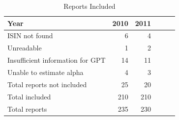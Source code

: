 \begin{table}
\caption{Reports Included}
\label{table:numreports}
\begin{tabular}{lrrrrr}
\toprule
Year & 2010 & 2011 \\
\midrule\addlinespace[0.4mm]\midrule
ISIN not found & 6 & 4 \\
Unreadable & 1 & 2 \\
Insufficient information for GPT & 14 & 11 \\
Unable to estimate alpha & 4 & 3 \\
\midrule
Total reports not included & 25 & 20 \\
Total included & 210 & 210 \\
\midrule
Total reports & 235 & 230 \\
\bottomrule
\end{tabular}
\end{table}
